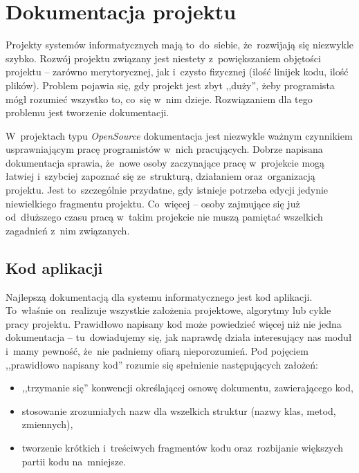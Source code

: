 \section{Dokumentacja projektu} \label{dokumentacja}

Projekty systemów informatycznych mają to~do~siebie, że~rozwijają się niezwykle szybko. Rozwój projektu związany jest niestety z~powiększaniem objętości projektu -- zarówno merytorycznej, jak i~czysto fizycznej (ilość linijek kodu, ilość plików). Problem pojawia się, gdy projekt jest zbyt ,,duży'', żeby programista mógł rozumieć wszystko to, co~się w~nim dzieje. Rozwiązaniem dla tego problemu jest tworzenie dokumentacji.


W~projektach typu \textit{OpenSource} dokumentacja jest niezwykle ważnym czynnikiem usprawniającym pracę programistów w~nich pracujących. Dobrze napisana dokumentacja sprawia, że~nowe osoby zaczynające pracę w~projekcie mogą łatwiej i~szybciej zapoznać się ze~strukturą, działaniem oraz~organizacją projektu. Jest to~szczególnie przydatne, gdy istnieje potrzeba edycji jedynie niewielkiego fragmentu projektu. Co~więcej -- osoby zajmujące się już od~dłuższego czasu pracą w~takim projekcie nie muszą pamiętać wszelkich zagadnień z~nim związanych.


\subsection{Kod aplikacji} \label{dokumentacja.kod}

Najlepszą dokumentacją dla systemu informatycznego jest kod aplikacji. To~właśnie on~realizuje wszystkie założenia projektowe, algorytmy lub cykle pracy projektu. Prawidłowo napisany kod może powiedzieć więcej niż nie jedna dokumentacja -- tu~dowiadujemy się, jak naprawdę działa interesujący nas moduł i~mamy pewność, że~nie padniemy ofiarą nieporozumień. Pod pojęciem ,,prawidłowo napisany kod'' rozumie się spełnienie następujących założeń:

\begin{itemize}
  \item ,,trzymanie się'' konwencji określającej osnowę dokumentu, zawierającego kod,
  \item stosowanie zrozumiałych nazw dla wszelkich struktur (nazwy klas, metod, zmiennych),
  \item tworzenie krótkich i~treściwych fragmentów kodu oraz~rozbijanie większych partii kodu na~mniejsze.
\end{itemize}

